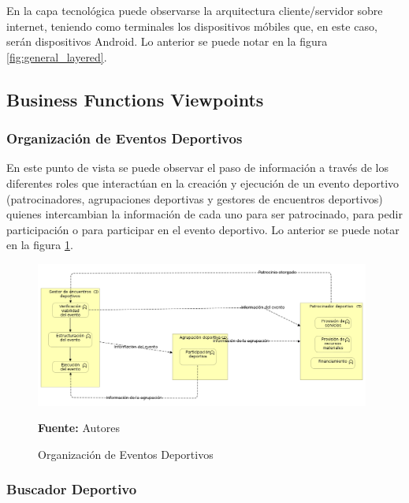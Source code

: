 En la capa tecnológica puede observarse la arquitectura cliente/servidor sobre internet, teniendo como terminales los dispositivos móbiles que, en este caso, serán dispositivos Android.  Lo anterior se puede notar en la figura \ref{fig:general_layered}.

\subsection{Business Functions Viewpoints}

\subsubsection{Organización de Eventos Deportivos}



En este punto de vista se puede observar el paso de información a través de los diferentes roles que interactúan en la creación y ejecución de un evento deportivo (patrocinadores, agrupaciones deportivas y gestores de encuentros deportivos) quienes intercambian la información de cada uno para ser patrocinado, para pedir participación o para participar en el evento deportivo. Lo anterior se puede notar en la figura \ref{fig:bf_organizacion_eventos_deportivos}.

\begin{figure}[!htb]
  \begin{center}
    \includegraphics[width=11cm]{./imagenes/Archimate/vistas/business_functions/organizacioneventosdeportivos.png}
    \caption{Organización de Eventos Deportivos}
    \label{fig:bf_organizacion_eventos_deportivos}
    \textbf{Fuente:}  Autores \\
  \end{center}
\end{figure}

\subsubsection{Buscador Deportivo}

